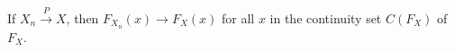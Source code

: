 If $X_n \xrightarrow{P} X$, then $F_{X_n}(x) \to F_X(x)$ for all $x$ in the continuity set $C(F_X)$ of $F_X$.
